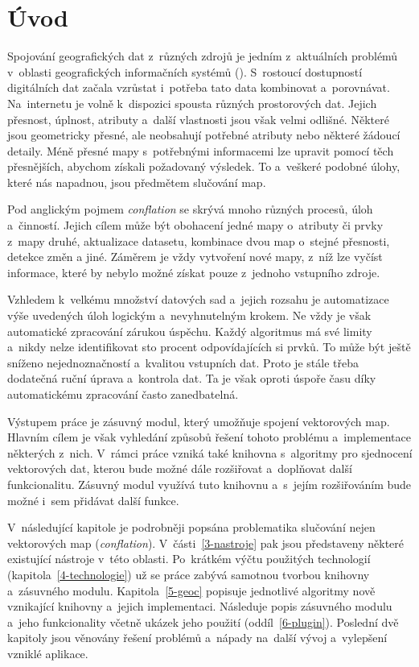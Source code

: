 \chapter{Úvod}
\label{1-uvod}

Spojování geografických dat z~různých zdrojů je jedním z~aktuálních
problémů v~oblasti geografických informačních systémů (). 
S~rostoucí dostupností di\-gitálních dat začala vzrůstat i~potřeba 
tato data kombinovat a~porovnávat. Na~internetu je volně k~dispozici 
spousta různých prostorových dat. Jejich přes\-nost, úplnost, 
atributy a~další vlastnosti jsou však velmi odlišné. Některé jsou 
geo\-metricky přesné, ale neobsahují potřebné atributy nebo některé 
žádoucí detaily. Méně přesné mapy s~potřebnými informacemi lze upravit 
pomocí těch přesnějších, abychom získali požadovaný výsledek. To 
a~veškeré podobné úlohy, které nás napadnou, jsou předmětem slučování 
map.

Pod anglickým pojmem \textit{conflation} se skrývá mnoho různých
procesů, úloh a~činností. Jejich cílem může být obohacení jedné mapy 
o~atributy či prvky z~mapy druhé, aktualizace datasetu, kombinace 
dvou map o~stejné přesnosti, detekce změn a jiné. Záměrem je vždy 
vytvoření nové mapy, z~níž lze vyčíst informace, které by nebylo možné
získat pouze z~jednoho vstupního zdroje.

Vzhledem k~velkému množství datových sad a~jejich rozsahu je automatizace
výše uvedených úloh logickým a~nevyhnutelným krokem. Ne vždy je však
automatické zpracování zárukou úspěchu. Každý algoritmus má své limity
a~nikdy nelze identifi\-kovat sto procent odpovídajících si prvků. To může
být ještě sníženo nejednoznač\-ností a~kvalitou vstupních dat. Proto je 
stále třeba dodatečná ruční úprava a~kontrola dat. Ta je však oproti 
úspoře času díky automatickému zpracování často za\-ne\-dbatelná.

Výstupem práce je zásuvný modul, který umožňuje spojení vektorových 
map. Hlavním cílem je však vyhledání způsobů řešení tohoto problému 
a~implementace některých z~nich. V~rámci práce vzniká také knihovna 
s~algoritmy pro sjednocení vektorových dat, kterou bude možné dále 
rozšiřovat a~doplňovat další funkcionalitu. Zásuvný modul využívá 
tuto knihovnu a~s~jejím rozšiřováním bude možné i~sem přidávat další 
funkce.   

V~následující kapitole je podrobněji popsána problematika slučování 
nejen vektorových map (\textit{conflation}). V~části~\ref{3-nastroje} 
pak jsou představeny některé existující nástroje v~této oblasti. 
Po~krátkém výčtu použitých technologií (kapitola~\ref{4-technologie})
už se práce zabývá samotnou tvorbou knihovny a~zásuvného modulu. 
Kapitola~\ref{5-geoc} popisuje jednotlivé algoritmy nově vznikající
knihovny a~jejich implementaci. Následuje popis zásuvného modulu 
a~jeho funkcionality včetně ukázek jeho použití (oddíl~\ref{6-plugin}). 
Poslední dvě kapitoly jsou věnovány řešení problémů a~nápady na~další 
vývoj a~vylepšení vzniklé aplikace.  


